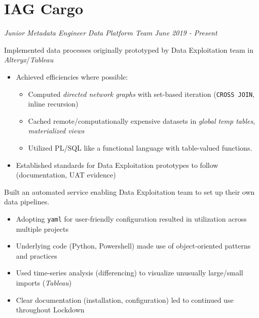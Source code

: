 \documentclass[../cv.tex]{subfiles}
\begin{document}
\section{IAG Cargo}
\textit{Junior Metadata Engineer}
\hfill
\textit{Data Platform Team}
\hfill
\textit{June 2019 - Present}
\begin{description}[style=multiline, leftmargin=3.5cm]
	\item[Prototype Implementation\\\textnormal{PL/SQL}] Implemented data processes originally prototyped by Data Exploitation team in \textit{Alteryx}/\textit{Tableau}
	      \begin{itemize}
		      \item Achieved efficiencies where possible:
		            \begin{itemize}
			            \item Computed \textit{directed network graphs} with set-based iteration (\texttt{CROSS JOIN}, inline recursion)
			            \item Cached remote/computationally expensive datasets in \textit{global temp tables}, \textit{materialized views}
			            \item Utilized PL/SQL like a functional language with table-valued functions.
		            \end{itemize}
		      \item Established standards for Data Exploitation prototypes to follow (documentation, UAT evidence)
	      \end{itemize}
	\item[Self-Service Pipeline Creation\\\textnormal{Python, Powershell}]
	      Built an automated service enabling Data Exploitation team to set up their own data pipelines.
	      \begin{itemize}
			  \item Adopting \texttt{yaml} for user-friendly configuration resulted in utilization across multiple projects
			  \item Underlying code (Python, Powershell) made use of object-oriented patterns and practices
			  \item Used time-series analysis (differencing) to visualize unusually large/small imports (\textit{Tableau})
		     \item Clear documentation (installation, configuration) led to continued use throughout Lockdown
	      \end{itemize}
	\item[Sales Relational Model\\ \textnormal{Oracle}]

\end{description}
\end{document}
